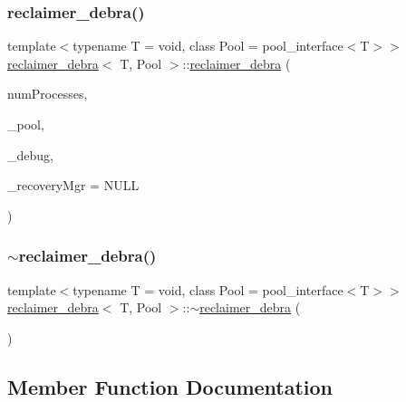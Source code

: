 \subsubsection{\texorpdfstring{reclaimer\+\_\+debra()}{reclaimer\_debra()}}
{\footnotesize\ttfamily template$<$typename T  = void, class Pool  = pool\+\_\+interface$<$\+T$>$$>$ \\
\hyperlink{classreclaimer__debra}{reclaimer\+\_\+debra}$<$ T, Pool $>$\+::\hyperlink{classreclaimer__debra}{reclaimer\+\_\+debra} (\begin{DoxyParamCaption}\item[{const int}]{num\+Processes,  }\item[{Pool $\ast$}]{\+\_\+pool,  }\item[{\hyperlink{classdebugInfo}{debug\+Info} $\ast$const}]{\+\_\+debug,  }\item[{\hyperlink{classRecoveryMgr}{Recovery\+Mgr}$<$ void $\ast$$>$ $\ast$const}]{\+\_\+recovery\+Mgr = {\ttfamily NULL} }\end{DoxyParamCaption})\hspace{0.3cm}{\ttfamily [inline]}}

\mbox{\label{classreclaimer__debra_a9cf18da9413262075c4f4dfdaa9eac6d}} 
\subsubsection{\texorpdfstring{$\sim$reclaimer\+\_\+debra()}{~reclaimer\_debra()}}
{\footnotesize\ttfamily template$<$typename T  = void, class Pool  = pool\+\_\+interface$<$\+T$>$$>$ \\
\hyperlink{classreclaimer__debra}{reclaimer\+\_\+debra}$<$ T, Pool $>$\+::$\sim$\hyperlink{classreclaimer__debra}{reclaimer\+\_\+debra} (\begin{DoxyParamCaption}{ }\end{DoxyParamCaption})\hspace{0.3cm}{\ttfamily [inline]}}



\subsection{Member Function Documentation}
\mbox{\label{classreclaimer__debra_a4e09296726d5118763f6a81868391e3b}} 
